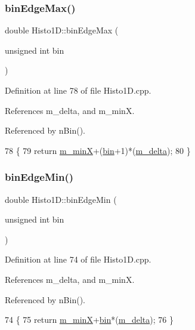 \subsubsection{\texorpdfstring{bin\+Edge\+Max()}{binEdgeMax()}}
{\footnotesize\ttfamily double Histo1\+D\+::bin\+Edge\+Max (\begin{DoxyParamCaption}\item[{unsigned int}]{bin }\end{DoxyParamCaption})}



Definition at line 78 of file Histo1\+D.\+cpp.



References m\+\_\+delta, and m\+\_\+minX.



Referenced by n\+Bin().


\begin{DoxyCode}
78                                              \{
79   \textcolor{keywordflow}{return} \hyperlink{classHisto1D_af5ce58b20e96fa6e4b306109dd88589e}{m\_minX}+(\hyperlink{classHisto1D_a2a8a7d93c2f10b73b490a6f550e00db4}{bin}+1)*(\hyperlink{classHisto1D_a993e2e40b89e257e6f86c0742f6f06b3}{m\_delta});
80 \}
\end{DoxyCode}
\mbox{\label{classHisto1D_aa15ab79f858358e3cafc0617eb668c2e}} 
\subsubsection{\texorpdfstring{bin\+Edge\+Min()}{binEdgeMin()}}
{\footnotesize\ttfamily double Histo1\+D\+::bin\+Edge\+Min (\begin{DoxyParamCaption}\item[{unsigned int}]{bin }\end{DoxyParamCaption})}



Definition at line 74 of file Histo1\+D.\+cpp.



References m\+\_\+delta, and m\+\_\+minX.



Referenced by n\+Bin().


\begin{DoxyCode}
74                                             \{
75   \textcolor{keywordflow}{return} \hyperlink{classHisto1D_af5ce58b20e96fa6e4b306109dd88589e}{m\_minX}+\hyperlink{classHisto1D_a2a8a7d93c2f10b73b490a6f550e00db4}{bin}*(\hyperlink{classHisto1D_a993e2e40b89e257e6f86c0742f6f06b3}{m\_delta});
76 \}
\end{DoxyCode}
\mbox{\label{classHisto1D_aaa8cd492ee25a3ad1b1694349fb1024c}} 
